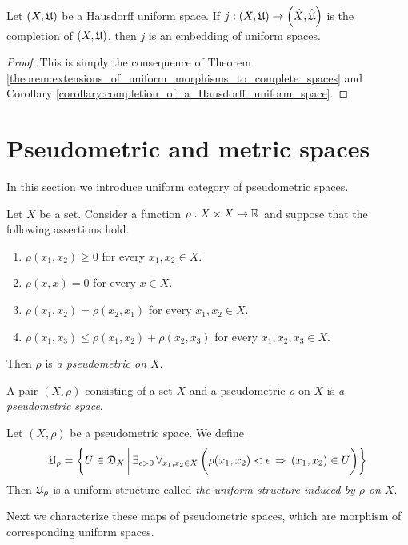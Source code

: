 \begin{corollary}\label{corollary:universal_property_of_completion_for_Hausdorff_spaces}
Let $\left(X,{\mathfrak U}\right)$ be a Hausdorff uniform space. If $j:\left(X,{\mathfrak U}\right)\rightarrow \left(\hat{X},\hat{{\mathfrak U}}\right)$ is the completion of $\left(X,{\mathfrak U}\right)$, then $j$ is an embedding of uniform spaces.
\end{corollary}
\begin{proof}
This is simply the consequence of Theorem \ref{theorem:extensions_of_uniform_morphisms_to_complete_spaces} and Corollary \ref{corollary:completion_of_a_Hausdorff_uniform_space}.
\end{proof}

\section{Pseudometric and metric spaces}
\noindent
In this section we introduce uniform category of pseudometric spaces.

\begin{definition}
Let $X$ be a set. Consider a function $\rho:X\times X\rightarrow {\mathbb R}$ and suppose that the following assertions hold.
\begin{enumerate}[label=\textbf{(\arabic*)}, leftmargin=*]
\item $\rho(x_1,x_2) \geq 0$ for every $x_1,x_2\in X$.
\item $\rho(x,x) = 0$ for every $x \in X$.
\item $\rho(x_1,x_2) = \rho(x_2,x_1)$ for every $x_1,x_2 \in X$.
\item $\rho(x_1,x_3) \leq \rho(x_1,x_2) + \rho(x_2, x_3)$ for every $x_1,x_2,x_3 \in X$.
\end{enumerate}
Then $\rho$ is \textit{a pseudometric on $X$}.
\end{definition}

\begin{definition}
A pair $(X,\rho)$ consisting of a set $X$ and a pseudometric $\rho$ on $X$ is \textit{a pseudometric space}.
\end{definition}

\begin{definition}
Let $(X,\rho)$ be a pseudometric space. We define
$${\mathfrak U}_{\rho} = \bigg\{U \in {\mathfrak D}_X\,\bigg|\,\exists_{\epsilon>0}\,\forall_{x_1,x_2\in X}\,\bigg(\rho(x_1,x_2) < \epsilon\,\Rightarrow\,(x_1,x_2)\in U\bigg)\bigg\}$$
Then ${\mathfrak U}_{\rho}$ is a uniform structure called \textit{the uniform structure induced by $\rho$ on $X$}.
\end{definition}
\noindent
Next we characterize these maps of pseudometric spaces, which are morphism of corresponding uniform spaces.

